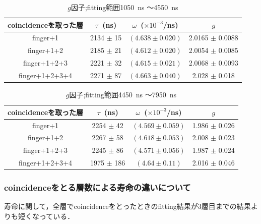   \begin{table}[H]
    \caption{$g$因子;fitting範囲1050~ns 〜4550~ns }
    \label{fitrange3}
    \begin{center}
     \begin{tabular}{cccc}\toprule
      coincidenceを取った層&$\tau$~(ns)& $\omega$~($\times 10^{-3}$/ns) & $g$ \\ \midrule
      finger+1             &2134 $\pm$ 15 & $( 4.638 \pm 0.020 ) $ & 2.0165 $\pm$ 0.0088 \\
      finger+1+2 	  &2185 $\pm$ 21 & $( 4.612 \pm 0.020 ) $ & 2.0054 $\pm$ 0.0085 \\
      finger+1+2+3 	  &2221 $\pm$ 32 & $( 4.615 \pm 0.021 ) $ & 2.0068 $\pm$ 0.0093\\
      finger+1+2+3+4 	  &2271 $\pm$ 87 & $( 4.663 \pm 0.040 ) $ & 2.028 $\pm$ 0.018 \\ \bottomrule
     \end{tabular}
    \end{center}    
  \end{table}%

  \begin{table}[H]
   \caption{$g$因子;fitting範囲4450~ns 〜7950~ns }
   \label{fitrange4}
   \begin{center}
    \begin{tabular}{cccc}\toprule
     coincidenceを取った層&$\tau$~(ns)& $\omega$~($\times 10^{-3}$/ns) & $g$ \\ \midrule
     finger+1             &2254 $\pm$ 42 & $( 4.569 \pm 0.059 ) $ & 1.986 $\pm$ 0.026 \\
     finger+1+2 	  &2267 $\pm$ 58 & $( 4.618 \pm 0.053 ) $ & 2.008 $\pm$ 0.023 \\
     finger+1+2+3 	  &2245 $\pm$ 86 & $( 4.571 \pm 0.056 ) $ & 1.987 $\pm$ 0.024\\
     finger+1+2+3+4 	  &1975 $\pm$ 186& $( 4.64 \pm 0.11 ) $ & 2.016 $\pm$ 0.046 \\ \bottomrule
    \end{tabular}
   \end{center}
  \end{table}%

  \subsubsection{coincidenceをとる層数による寿命の違いについて}
  寿命に関して，全層でcoincidenceをとったときのfitting結果が3層目までの結果よりも短くなっている．

